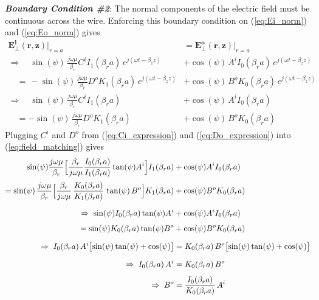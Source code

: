 \hspace*{2em} \textit{\textbf{Boundary Condition \#2}}: The normal components of the electric field must be continuous across the wire. Enforcing this boundary condition on (\ref{eq:Ei_norm}) and (\ref{eq:Eo_norm}) gives
\begin{equation}
	\begin{split}
		\mathbf{E_{\perp}^i(r,z)}\Big|_{r=a} &= \mathbf{E_{\perp}^o(r,z)}\Big|_{r=a} \\
		\Rightarrow\quad
		\sin(\psi)\, \frac{j\omega\mu}{\beta_r} C^i I_1(\beta_r a)\, e^{j(\omega t - \beta_z z)} 
		&+ \cos(\psi)\, A^i I_0(\beta_r a)\, e^{j(\omega t - \beta_z z)} \\
		\quad=\, -\sin(\psi)\, \frac{j\omega\mu}{\beta_r} D^o K_1(\beta_r a)\, e^{j(\omega t - \beta_z z)} 
		&+ \cos(\psi)\, B^o K_0(\beta_r a)\, e^{j(\omega t - \beta_z z)} \\
		\Rightarrow\quad
		\sin(\psi)\, \frac{j\omega\mu}{\beta_r} C^i I_1(\beta_r a) 
		&+ \cos(\psi)\, A^i I_0(\beta_r a) \\
		\quad= -\sin(\psi)\, \frac{j\omega\mu}{\beta_r} D^o K_1(\beta_r a) 
		&+ \cos(\psi)\, B^o K_0(\beta_r a)
	\end{split}
	\label{eq:field_matching}
\end{equation}
Plugging $C^i$ and $D^o$ from (\ref{eq:Ci_expression}) and (\ref{eq:Do_expression}) into (\ref{eq:field_matching}) gives
\begin{equation}
	\begin{split}
		\sin(\psi)\frac{j\omega\mu}{\beta_r}
		\Bigl[\frac{\beta_r}{j\omega\mu}
		\frac{I_0(\beta_r a)}{I_1(\beta_r a)}
		\tan(\psi)A^{i}\Bigr] I_1(\beta_r a)
		&+ \cos(\psi)A^{i} I_0(\beta_r a) \\[2pt]
		= \sin(\psi)\,\frac{j\omega\mu}{\beta_r}
		\Bigl[\frac{\beta_r}{j\omega\mu}\,
		\frac{K_0(\beta_r a)}{K_1(\beta_r a)}\,
		\tan(\psi)\,B^{o}\Bigr] K_1(\beta_r a)
		&+ \cos(\psi)B^{o} K_0(\beta_r a)\\[6pt]
		\Rightarrow\;
		\sin(\psi)I_0(\beta_r a)\tan(\psi)A^{i}
		&+ \cos(\psi)A^{i} I_0(\beta_r a) \\[4pt]
		= \sin(\psi)K_0(\beta_r a)\tan(\psi)B^{o}
		&+ \cos(\psi)B^{o} K_0(\beta_r a) \\[6pt]
		\Rightarrow\;
		I_0(\beta_r a)\,A^{i}\bigl[\sin(\psi)\tan(\psi)+\cos(\psi)\bigr]
		&= K_0(\beta_r a)\,B^{o}\bigl[\sin(\psi)\tan(\psi)+\cos(\psi)\bigr] \\[6pt]
		\Rightarrow\;
		I_0(\beta_r a)\,A^{i} &= K_0(\beta_r a)\,B^{o} \\[4pt]
		\Rightarrow\;
		B^{o} &= \frac{I_0(\beta_r a)}{K_0(\beta_r a)}\,A^{i}
	\end{split}
	\label{eq:B0inTermsOfAi}
\end{equation}

